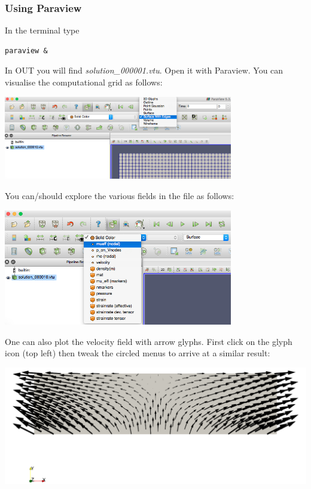 \documentclass[a4paper]{article}
\begin{document}
\subsubsection{Using Paraview}

In the terminal type
\begin{verbatim}
paraview &
\end{verbatim}
In OUT you will find {\sl solution\_000001.vtu}. Open it with Paraview.
You can visualise the computational grid as follows:
\begin{center}
\includegraphics[width=10cm]{images/visugrid}
\end{center}

You can/should explore the various fields in the file as follows:

\begin{center}
\includegraphics[width=10cm]{images/visugrid2}
\end{center}

One can also plot the velocity field with arrow glyphs. First click on the glyph icon (top left) then tweak the circled 
menus to arrive at a similar result: 

\begin{center}
\includegraphics[width=16cm]{images/visuarrows}
\end{center}
\end{document}
